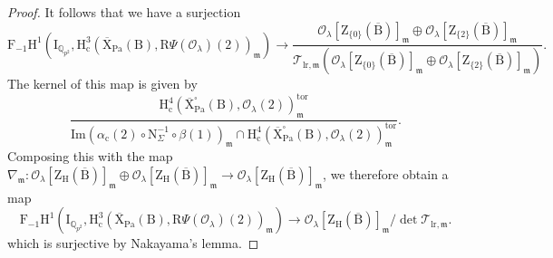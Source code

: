 \documentclass[10pt]{amsart}
\numberwithin{equation}{section}
\theoremstyle{definition}
\def\lr{\mathrm{lr}}
\def\Pa{\mathrm{Pa}}
\def\calO{\mathcal{O}}
\def\calT{\mathcal{T}}
\def\fracm{\mathfrak{m}}
\def\QQ{\mathbb{Q}}
\def\rmc{\mathrm{c}}
\def\rmB{\mathrm{B}}
\def\rmH{\mathrm{H}}
\def\rmN{\mathrm{N}}
\def\rmR{\mathrm{R}}
\def\rmX{\mathrm{X}}
\def\rmZ{\mathrm{Z}}
\begin{document}
\begin{proof}
It follows that we have a surjection
\begin{equation*}
\mathrm{F}_{-1}\mathrm{H}^{1}(\mathrm{I}_{\QQ_{p^{2}}}, \rmH^{3}_{\rmc}(\overline{\rmX}_{\Pa}(\rmB), \rmR\Psi(\calO_{\lambda})(2))_{\fracm})\rightarrow \frac{\calO_{\lambda}[\rmZ_{\{0\}}(\overline{\rmB})]_{\fracm}\oplus\calO_{\lambda}[\rmZ_{\{2\}}(\overline{\rmB})]_{\fracm}}{\calT_{\lr,\fracm}(\calO_{\lambda}[\rmZ_{\{0\}}(\overline{\rmB})]_{\fracm}\oplus\calO_{\lambda}[\rmZ_{\{2\}}(\overline{\rmB})]_{\fracm})}.
\end{equation*}
The kernel of this map is given by
\begin{equation*}
\frac{\rmH^{4}_{\rmc}(\overline{\rmX}^{\square}_{\Pa}(\rmB), \calO_{\lambda}(2))^{\mathrm{tor}}_{\fracm}}{\mathrm{Im}(\alpha_{\rmc}(2)\circ \rmN^{-1}_{\Sigma}\circ \beta(1))_{\fracm}\cap \rmH^{4}_{\rmc}(\overline{\rmX}^{\square}_{\Pa}(\rmB), \calO_{\lambda}(2))^{\mathrm{tor}}_{\fracm}}.
\end{equation*}
Composing this with the map $\nabla_{\fracm}:\calO_{\lambda}[\rmZ_{\rmH}(\overline{\rmB})]_{\fracm}\oplus\calO_{\lambda}[\rmZ_{\rmH}(\overline{\rmB})]_{\fracm}\rightarrow \calO_{\lambda}[\rmZ_{\rmH}(\overline{\rmB})]_{\fracm}$, we therefore obtain a map
\begin{equation*}
\mathrm{F}_{-1}\mathrm{H}^{1}(\mathrm{I}_{\QQ_{p^{2}}}, \rmH^{3}_{\rmc}(\overline{\rmX}_{\Pa}(\rmB), \rmR\Psi(\calO_{\lambda})(2))_{\fracm})\rightarrow \calO_{\lambda}[\rmZ_{\rmH}(\overline{\rmB})]_{\fracm}/\det\calT_{\lr,\fracm}.
\end{equation*}
which is surjective by Nakayama's lemma.


\end{proof}
\end{document}
